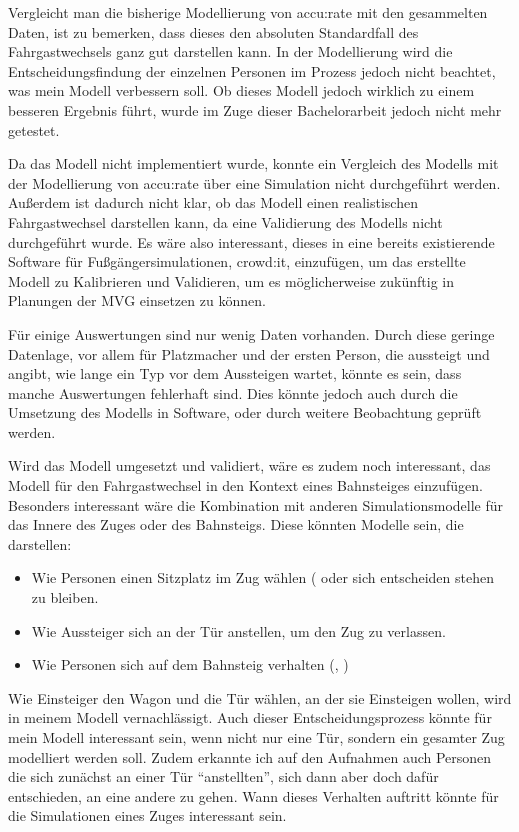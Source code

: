 Vergleicht man die bisherige Modellierung von accu:rate mit den gesammelten Daten, ist zu bemerken, dass dieses den absoluten Standardfall des Fahrgastwechsels ganz gut darstellen kann. In der Modellierung wird die Entscheidungsfindung der einzelnen Personen im Prozess jedoch nicht beachtet, was mein Modell verbessern soll. Ob dieses Modell jedoch wirklich zu einem besseren Ergebnis führt, wurde im Zuge dieser Bachelorarbeit jedoch nicht mehr getestet. 

Da das Modell nicht implementiert wurde, konnte ein Vergleich des Modells mit der Modellierung von accu:rate über eine Simulation nicht durchgeführt werden. Außerdem ist dadurch nicht klar, ob das Modell einen realistischen Fahrgastwechsel darstellen kann, da eine Validierung des Modells nicht durchgeführt wurde. Es wäre also interessant, dieses in eine bereits existierende Software für Fußgängersimulationen, \zB crowd:it, einzufügen, um das erstellte Modell zu Kalibrieren und Validieren, um es möglicherweise zukünftig in Planungen der MVG einsetzen zu können.

Für einige Auswertungen sind nur wenig Daten vorhanden. Durch diese geringe Datenlage, vor allem für Platzmacher und der ersten Person, die aussteigt und angibt, wie lange ein Typ vor dem Aussteigen wartet, könnte es sein, dass manche Auswertungen fehlerhaft sind. Dies könnte jedoch auch durch die Umsetzung des Modells in Software, oder durch weitere Beobachtung geprüft werden.

Wird das Modell umgesetzt und validiert, wäre es zudem noch interessant, das Modell für den Fahrgastwechsel in den Kontext eines Bahnsteiges einzufügen. Besonders interessant wäre die Kombination mit anderen Simulationsmodelle für das Innere des Zuges oder des Bahnsteigs. Diese könnten Modelle sein, die darstellen:
\begin{itemize}
\item Wie Personen einen Sitzplatz im Zug wählen (\cite{Schottl.2016} oder sich entscheiden stehen zu bleiben.
\item Wie Aussteiger sich an der Tür anstellen, um den Zug zu verlassen.
\item Wie Personen sich auf dem Bahnsteig verhalten (\cite{Davidich.2013}, \cite{Chen.2017})
\end{itemize}

Wie Einsteiger den Wagon und die Tür wählen, an der sie Einsteigen wollen, wird in meinem Modell vernachlässigt. Auch dieser Entscheidungsprozess könnte für mein Modell interessant sein, wenn nicht nur eine Tür, sondern ein gesamter Zug modelliert werden soll. Zudem erkannte ich auf den Aufnahmen auch Personen die sich zunächst an einer Tür "`anstellten"', sich dann aber doch dafür entschieden, an eine andere zu gehen. Wann dieses Verhalten auftritt könnte für die Simulationen eines Zuges interessant sein.

